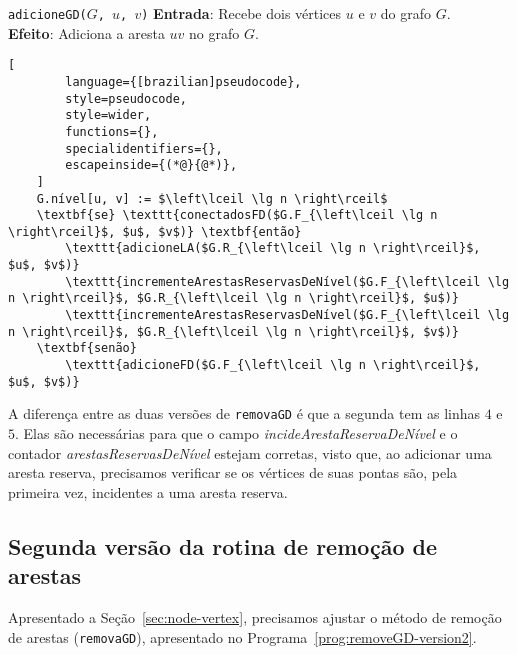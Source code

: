 \begin{programruledcaption}{\texttt{adicioneGD($G$, $u$, $v$)} \label{prog:addGD-version2}}
    \noindent\textbf{Entrada}: Recebe dois vértices $u$ e $v$ do grafo $G$. \\
    \textbf{Efeito}: Adiciona a aresta $uv$ no grafo $G$.
    \vspace{-0.5\baselineskip}
    \begin{lstlisting}[
        language={[brazilian]pseudocode},
        style=pseudocode,
        style=wider,
        functions={},
        specialidentifiers={},
        escapeinside={(*@}{@*)},
    ]
    G.nível[u, v] := $\left\lceil \lg n \right\rceil$
    \textbf{se} \texttt{conectadosFD($G.F_{\left\lceil \lg n \right\rceil}$, $u$, $v$)} \textbf{então}
        \texttt{adicioneLA($G.R_{\left\lceil \lg n \right\rceil}$, $u$, $v$)}
        \texttt{incrementeArestasReservasDeNível($G.F_{\left\lceil \lg n \right\rceil}$, $G.R_{\left\lceil \lg n \right\rceil}$, $u$)}
        \texttt{incrementeArestasReservasDeNível($G.F_{\left\lceil \lg n \right\rceil}$, $G.R_{\left\lceil \lg n \right\rceil}$, $v$)}
    \textbf{senão}
        \texttt{adicioneFD($G.F_{\left\lceil \lg n \right\rceil}$, $u$, $v$)}
    \end{lstlisting}
    \vspace{-0.5\baselineskip}
\end{programruledcaption}

A diferença entre as duas versões de \texttt{removaGD} é que a segunda tem as linhas $4$ e $5$. Elas são necessárias para que o campo \textit{incideArestaReservaDeNível} e o contador \textit{arestasReservasDeNível} estejam corretas, visto que, ao adicionar uma aresta reserva, precisamos verificar se os vértices de suas pontas são, pela primeira vez, incidentes a uma aresta reserva. 

\subsection{Segunda versão da rotina de remoção de arestas}
\label{sec:code-edge-removal-second-version}

Apresentado a Seção~\ref{sec:node-vertex}, precisamos ajustar o método de remoção de arestas (\texttt{removaGD}), apresentado no Programa~\ref{prog:removeGD-version2}. 

